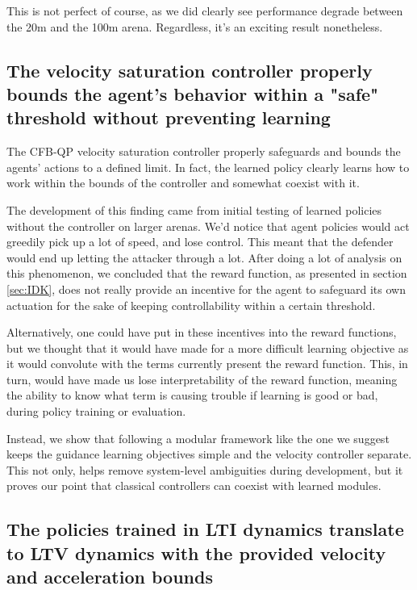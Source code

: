  This is not perfect of course, as we did clearly see performance degrade between the 20m and the 100m arena. Regardless, it's an exciting result nonetheless.


\subsection*{The velocity saturation controller properly bounds the agent's behavior within a "safe" threshold without preventing learning}

The CFB-QP velocity saturation controller properly safeguards and bounds the agents' actions to a defined limit. In fact, the learned policy clearly learns how to work within the bounds of the controller and somewhat coexist with it. 
    
The development of this finding came from initial testing of learned policies without the controller on larger arenas. We'd notice that agent policies would act greedily pick up a lot of speed, and lose control. This meant that the defender would end up letting the attacker through a lot. After doing a lot of analysis on this phenomenon, we concluded that the reward function, as presented in section \ref{sec:IDK}, does not really provide an incentive for the agent to safeguard its own actuation for the sake of keeping controllability within a certain threshold.

Alternatively, one could have put in these incentives into the reward functions, but we thought that it would have made for a more difficult learning objective as it would convolute with the terms currently present the reward function. This, in turn, would have made us lose interpretability of the reward function, meaning the ability to know what term is causing trouble if learning is good or bad, during policy training or evaluation.

Instead, we show that following a modular framework like the one we suggest keeps the guidance learning objectives simple and the velocity controller separate. This not only, helps remove system-level ambiguities during development, but it proves our point that classical controllers can coexist with learned modules.


\subsection*{The policies trained in LTI dynamics translate to LTV dynamics with the provided velocity and acceleration bounds}

